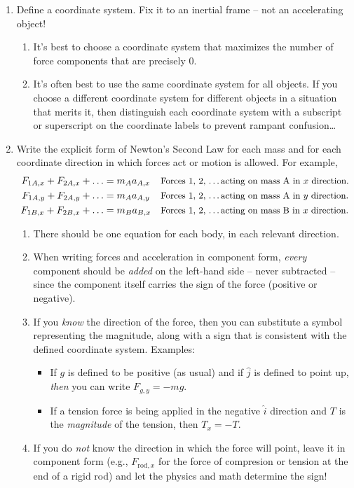 \documentclass[11pt, letterpaper, openany]{book}
\begin{document}
\begin{enumerate}
    \item Define a coordinate system. Fix it to an inertial frame -- not an accelerating object!
    \begin{enumerate}[label=\alph*.]
        \item It's best to choose a coordinate system that maximizes the number of force components that are precisely 0.
        \item It's often best to use the same coordinate system for all objects. If you choose a different coordinate system for different objects in a situation that merits it, then distinguish each coordinate system with a subscript or superscript on the coordinate labels to prevent rampant confusion\dots
    \end{enumerate}
    
    \item Write the explicit form of Newton's Second Law for each mass and for each coordinate direction in which forces act or motion is allowed. For example,
    \begin{align*}
        F_{1A,x} + F_{2A,x} + \dots &= m_A a_{A,x} && \text{\small Forces 1, 2, \dots acting on mass A in $x$ direction.} \\
        F_{1A,y} + F_{2A,y} + \dots &= m_A a_{A,y} && \text{\small Forces 1, 2, \dots acting on mass A in $y$ direction.} \\
        F_{1B,x} + F_{2B,x} + \dots &= m_B a_{B,x} && \text{\small Forces 1, 2, \dots acting on mass B in $x$ direction.}
    \end{align*}
    \begin{enumerate}[label=\alph*.]
        \item There should be one equation for each body, in each relevant direction.
        \item When writing forces and acceleration in component form, \textit{every} component should be \textit{added} on the left-hand side -- never subtracted -- since the component itself carries the sign of the force (positive or negative).
        \item If you \textit{know} the direction of the force, then you can substitute a symbol representing the magnitude, along with a sign that is consistent with the defined coordinate system. Examples:
        \begin{itemize}
            \item If $g$ is defined to be positive (as usual) and if $\hat{j}$ is defined to point up, \textit{then} you can write $F_{g,y} = -mg$.
            \item If a tension force is being applied in the negative $\hat{i}$ direction and $T$ is the \textit{magnitude} of the tension, then $T_x = -T$.
        \end{itemize}
        \item If you do \textit{not} know the direction in which the force will point, leave it in component form (e.g., $F_{\text{rod},x}$ for the force of compresion or tension at the end of a rigid rod) and let the physics and math determine the sign!
    \end{enumerate}
    

\end{enumerate}
\end{document}
